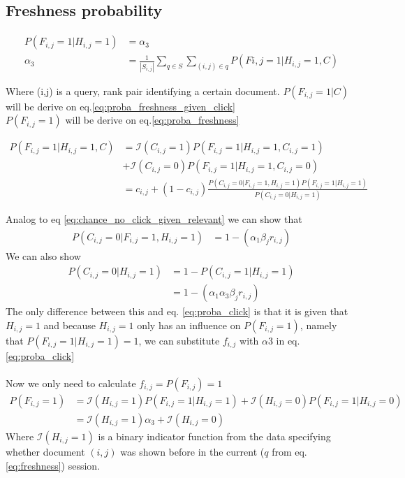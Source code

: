 \subsection{Freshness probability}
\begin{align}
P(F_{i,j} = 1 | H_{i,j} = 1) &= \alpha_3 \\
\alpha_3 &= \frac{1}{|S_{i,j}|} \sum_{q \in S} \sum_{(i,j) \in q} P(F{i,j}=1 | H_{i,j}=1, C)
\label{eq:freshness}
\end{align}

Where (i,j) is a query, rank pair identifying a certain document.
$P(F_{i,j}=1 | C)$ will be derive on eq.\ref{eq:proba_freshness_given_click} \\
$P(F_{i,j}=1)$ will be derive on eq.\ref{eq:proba_freshness}

\begin{align}
\label{eq:proba_freshness_given_click}
P(F_{i,j}=1 | H_{i,j}=1, C)
&= \mathcal{I}(C_{i,j} = 1) P(F_{i,j}=1|H_{i,j}=1,C_{i,j}=1) \\
&+ \mathcal{I}(C_{i,j} = 0) P(F_{i,j}=1|H_{i,j}=1,C_{i,j}=0) \\
&= c_{i,j} + (1-c_{i,j}) \frac {P(C_{i,j}=0|F_{i,j}=1,H_{i,j}=1) P(F_{i,j} = 1 | H_{i,j}=1)} {P(C_{i,j} = 0 | H_{i,j} = 1)}
\end{align}

Analog to eq \ref{eq:chance_no_click_given_relevant} we can show that
\begin{align}
P(C_{i,j}=0|F_{i,j}=1, H_{i,j}=1) &= 1 - (\alpha_1 \beta_j r_{i,j})
\label{eq:no_click_freshness}
\end{align}
We can also show
\begin{align}
P(C_{i,j}=0|H_{i,j}=1) 
&= 1 - P(C_{i,j}=1|H_{i,j}=1) \\
&= 1-(\alpha_1 \alpha_3 \beta_j r_{i,j})
\end{align}
The only difference between this and eq.  \ref{eq:proba_click} is that it is given that $H_{i,j}=1$ and because $H_{i,j} = 1$ only has an influence on $P(F_{i,j}=1)$, namely that $P(F_{i,j}=1 | H_{i,j} = 1) = 1$, we can substitute $f_{i,j}$ with $\alpha3$ in eq. \ref{eq:proba_click}\\
\\
Now we only need to calculate $f_{i,j} = P(F_{i,j}) = 1$
\begin{align}
\label{eq:proba_freshness}
P(F_{i,j} = 1)
&= \mathcal{I}(H_{i,j}=1) P(F_{i,j}=1|H_{i,j}=1) + \mathcal{I}(H_{i,j}=0) P(F_{i,j}=1|H_{i,j}=0) \\
&= \mathcal{I}(H_{i,j}=1) \alpha_3 + \mathcal{I}(H_{i,j}=0)
\end{align}
Where $\mathcal{I}(H_{i,j}=1)$ is a binary indicator function from the data specifying whether document $(i,j)$ was shown before in the current ($q$ from eq. \ref{eq:freshness}) session.\\

